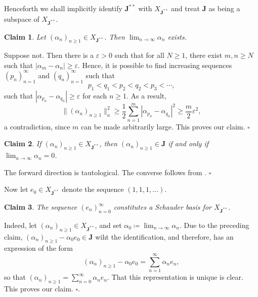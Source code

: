 \documentclass[11pt]{article}
\theoremstyle{thmstyle}
\theoremstyle{defstyle}
\newtheorem*{claim}{Claim}
\renewcommand{\ge}{\geqslant}
\newcommand{\bfJ}{\mathbf{J}}
\begin{document}
Henceforth we shall implicitly identify $\bfJ^{\ast\ast}$ with $X_{\bfJ^{\ast\ast}}$ and treat $\bfJ$ as being a subspace of $X_{\bfJ^{\ast\ast}}$.

\begin{claim}
	Let $(\alpha_n)_{n\ge 1}\in X_{\bfJ^{\ast\ast}}$. Then $\displaystyle\lim_{n\to\infty}\alpha_n$ exists.
\end{claim}
Suppose not. Then there is a $\varepsilon > 0$ such that for all $N\ge 1$, there exist $m, n\ge N$ such that $|\alpha_m - \alpha_n|\ge\varepsilon$. Hence, it is possible to find increasing sequences $(p_n)_{n = 1}^\infty$ and $(q_n)_{n = 1}^\infty$ such that 
\begin{equation*}
	p_1 < q_1 < p_2 < q_2 < p_3 < \cdots,
\end{equation*}
such that $|\alpha_{p_n} - \alpha_{q_n}|\ge\varepsilon$ for each $n\ge 1$. As a result, 
\begin{equation*}
	\|(\alpha_n)_{n\ge 1}\|_a^2\ge\frac{1}{2}\sum_{n = 1}^m |\alpha_{p_n} - \alpha_{q_n}|^2\ge\frac{m}{2}\varepsilon^2,
\end{equation*}
a contradiction, since $m$ can be made arbitrarily large. This proves our claim. \hfill$\square$

\begin{claim}
	If $(\alpha_n)_{n\ge 1}\in X_{\bfJ^{\ast\ast}}$, then $(\alpha_n)_{n\ge 1}\in\bfJ$ if and only if $\displaystyle\lim_{n\to\infty}\alpha_n = 0$.
\end{claim}
The forward direction is tautological. The converse follows from . \hfill$\square$

Now let $e_0\in X_{\bfJ^{\ast\ast}}$ denote the sequence $(1, 1, 1, \dots)$.

\begin{claim}
	The sequence $(e_n)_{n = 0}^\infty$ constitutes a Schauder basis for $X_{\bfJ^{\ast\ast}}$.
\end{claim}
Indeed, let $(\alpha_n)_{n\ge 1}\in X_{\bfJ^{\ast\ast}}$, and set $\alpha_0 \coloneq\displaystyle\lim_{n\to\infty}\alpha_n$. Due to the preceding claim, $(\alpha_n)_{n\ge 1} - \alpha_0 e_0\in\bfJ$ wiht the identification, and therefore, has an expression of the form 
\begin{equation*}
	(\alpha_n)_{n\ge 1} - \alpha_0 e_0 = \sum_{n = 1}^\infty \alpha_n e_n,
\end{equation*}
so that $\displaystyle(\alpha_n)_{n\ge 1} = \sum_{n = 0}^\infty \alpha_n e_n$. That this representation is unique is clear. This proves our claim. \hfill$\square$.
\end{document}
